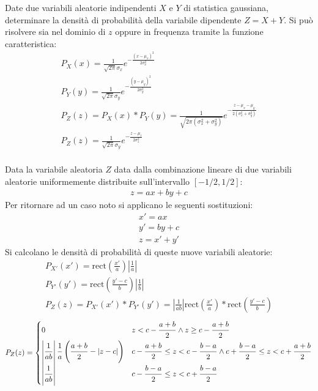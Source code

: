\documentclass{article}
\newcommand{\rect}{\mathrm{rect}}
\begin{document}
Date due variabili aleatorie indipendenti $X$ e $Y$ di statistica gaussiana, determinare la densità di probabilità della variabile dipendente $Z=X+Y$. 
Si può risolvere sia nel dominio di $z$ oppure in frequenza tramite la funzione caratteristica:
\begin{gather*}
    P_X(x)=\displaystyle\frac{1}{\sqrt{2\pi}\sigma_x}e^{-\frac{(x-\mu_x)^2}{2\sigma_x^2}}\\
    P_Y(y)=\displaystyle\frac{1}{\sqrt{2\pi}\sigma_y}e^{-\frac{(y-\mu_y)^2}{2\sigma_y^2}}\\
    P_Z(z)=P_X(x)*P_Y(y)=\displaystyle\frac{1}{\sqrt{2\pi(\sigma_x^2+\sigma_y^2)}}e^{-\frac{z-\mu_x-\mu_y}{2(\sigma_x^2+\sigma_y^2)}}\\
    P_Z(z)=\displaystyle\frac{1}{\sqrt{2\pi}\sigma_y}e^{-\frac{z-\mu_z}{2\sigma_z^2}}\\
\end{gather*} 


Data la variabile aleatoria $Z$ data dalla combinazione lineare di due variabili aleatorie uniformemente distribuite sull'intervallo $[-1/2,1/2]$:
\begin{gather*}
    z=ax+by+c
\end{gather*}
Per ritornare ad un caso noto si applicano le seguenti sostituzioni:
\begin{gather*}
    x'=ax\\
    y'=by+c\\
    z=x'+y'
\end{gather*}
Si calcolano le densità di probabilità di queste nuove variabili aleatorie:
\begin{gather*}
    P_{X'}(x')=\rect\displaystyle\left(\frac{x'}{a}\right)\left|\frac{1}{a}\right|\\
    P_{Y'}(y')=\rect\displaystyle\left(\frac{y'-c}{b}\right)\left|\frac{1}{b}\right|\\
    P_Z(z)=P_{X'}(x')*P_{Y'}(y')=\displaystyle\left|\frac{1}{ab}\right|\rect\left(\frac{x'}{a}\right)*\rect\left(\frac{y'-c}{b}\right)
\end{gather*}
\begin{equation}
    P_Z(z)=\begin{cases}
        0 &z<c-\displaystyle\frac{\strut a+b}{\strut 2} \land z\geq c-\frac{\strut a+b}{\strut 2}\\
        \displaystyle \left|\frac{\strut 1}{\strut ab}\right|\frac{\strut 1}{\strut a}\left(\frac{\strut a+b}{\strut 2}-|z-c|\right)&\displaystyle c-\frac{\strut a+b}{2}\leq z< c-\frac{\strut b-a}{\strut 2}\land c+\frac{\strut b-a}{\strut 2}\leq z<c+\frac{\strut a+b}{\strut 2}\\
        \displaystyle\left|\frac{\strut 1}{\strut ab}\right|&c-\displaystyle\frac{\strut b-a}{\strut 2}\leq z<c+\frac{\strut b-a}{\strut 2}
    \end{cases}
\end{equation}
\end{document}
